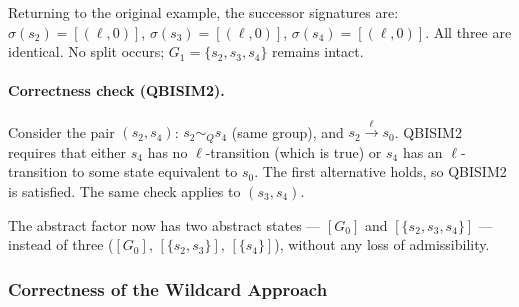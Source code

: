\documentclass[11pt,a4paper]{article}
\begin{document}
Returning to the original example, the successor signatures are:
$\sigma(s_2) = [(\ell, 0)]$,
$\sigma(s_3) = [(\ell, 0)]$,
$\sigma(s_4) = [(\ell, 0)]$.
All three are identical.  No split occurs; $G_1 = \{s_2, s_3, s_4\}$ remains
intact.

\paragraph{Correctness check (QBISIM2).}
Consider the pair $(s_2, s_4)$: $s_2 \sim_Q s_4$ (same group), and
$s_2 \xrightarrow{\ell} s_0$.  QBISIM2 requires that either $s_4$ has no
$\ell$-transition (which is true) or $s_4$ has an $\ell$-transition to some
state equivalent to $s_0$.  The first alternative holds, so QBISIM2 is
satisfied.  The same check applies to $(s_3, s_4)$.

The abstract factor now has two abstract states --- $[G_0]$ and
$[\{s_2,s_3,s_4\}]$ --- instead of three ($[G_0]$, $[\{s_2,s_3\}]$,
$[\{s_4\}]$), without any loss of admissibility.

\subsubsection{Correctness of the Wildcard Approach}
\end{document}

